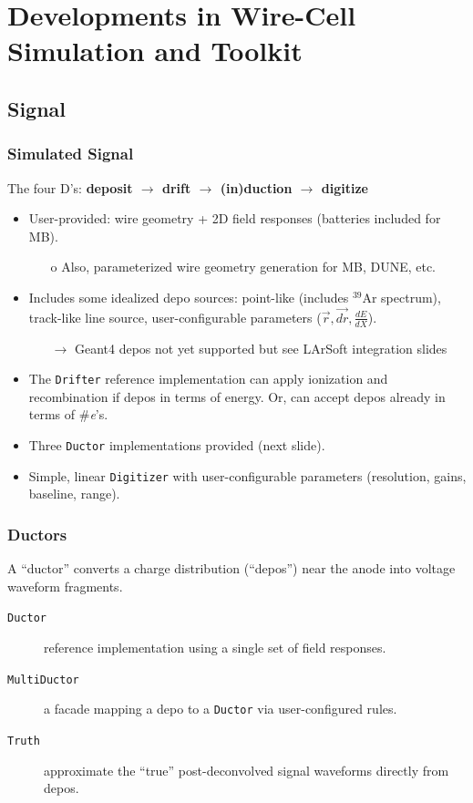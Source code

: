 \documentclass[xcolor=dvipsnames]{beamer}
\begin{document}



\section{Developments in Wire-Cell Simulation and Toolkit}
\subsection{Signal}
\begin{frame}
\end{frame}

\begin{frame}
  \frametitle{Simulated Signal}
  The four D's: \textbf{deposit $\to$ drift $\to$ (in)duction $\to$ digitize}
  \begin{itemize}\scriptsize
  \item User-provided:  wire geometry + 2D field responses (batteries included for MB).
    \begin{itemize}\tiny
    \item[o] Also, parameterized wire geometry generation for MB, DUNE, etc.
    \end{itemize}
  \item Includes some idealized depo sources: point-like (includes
    $^{39}$Ar spectrum), track-like line source, user-configurable
    parameters ($\vec{r}, \vec{dr}, \frac{dE}{dX}$).
    \begin{itemize}\tiny
    \item[$\to$] Geant4 depos not yet supported but see LArSoft integration slides
    \end{itemize}
  \item The \texttt{Drifter} reference implementation can apply
    ionization and recombination if depos in terms of energy. 
    Or, can accept depos already in terms of \#\textit{e}'s.
  \item Three \texttt{Ductor} implementations provided (next slide).
  \item Simple, linear \texttt{Digitizer} with user-configurable
    parameters (resolution, gains, baseline, range).
  \end{itemize}
\end{frame}

\begin{frame}
  \frametitle{Ductors}
  A ``ductor'' converts a charge distribution (``depos'') near the
  anode into voltage waveform fragments.

  \begin{description}
  \item[\texttt{Ductor}] reference implementation using a single set of field responses.
  \item[\texttt{MultiDuctor}] a facade mapping a depo to a \texttt{Ductor} via user-configured rules.
  \item[\texttt{Truth}] approximate the ``true'' post-deconvolved signal waveforms directly from depos.
  \end{description}

\end{frame}
\end{document}
